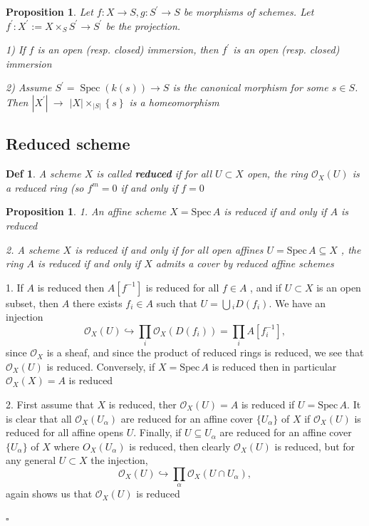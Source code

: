 \documentclass{article}
\newtheorem{definition}[theorem]{Def}
\newtheorem{proposition}[theorem]{Proposition}
\newenvironment{Proof}{{\noindent \indent \it Proof:\quad}}{\hfill $\square$\par}
\begin{document}
\begin{proposition}
    Let $f\colon X\to S,g\colon S^{\prime}\to S$ be morphisms of schemes. Let $f^{\prime}\colon X^{\prime}:=X\times_{S}S^{\prime}\to S^{\prime}$ be the projection. 
    
    1) If $f$ is an open (resp. closed) immersion, then $f^{\prime}$ is an open (resp. closed) immersion 
    
    2) Assume $S^{\prime}=\operatorname{Spec}(k(s))\to S$ is the canonical morphism for some $s\in S$.
    Then $|X^{\prime}|\ \to$  $|X|\times_{|S|}\left\{s\right\}$ is a homeomorphism
\end{proposition}






\newpage
\subsection{Reduced scheme}
\begin{definition}
    A scheme $X$ is called \textbf{reduced} if for all $U\subset X$ open, the ring ${\mathcal{O}}_{X}(U)$ is a reduced ring (so $f^{m}=0$ if and only if $\displaystyle f=0$
\end{definition}

\begin{proposition}
1. An affine scheme $X={\mathrm{Spec}}\,A$ is reduced if and only if $A$ is reduced 

2. A scheme $X$ is reduced if and only if for all open affines $U={\mathrm{Spec}}\,A\subseteq X$ , the ring $A$ is reduced if and only if $X$ admits a cover by reduced affine schemes
\end{proposition}

\begin{Proof}
    1. If $A$ is reduced then $A[f^{-1}]$ is reduced for all $f\in{A}$ , and if $U\subset{X}$ is an open subset, then $A$ 
there exists $f_{i}\in A$ such that $U=\bigcup{}_{i}D(f_{i})$. We have an injection
$$
{\mathcal{O}}_{X}(U)\hookrightarrow\prod_{i}{\mathcal{O}}_{X}(D(f_{i}))=\prod_{i}A[f_{i}^{-1}], 
$$
since ${\mathcal{O}}_{X}$ is a sheaf, and since the product of reduced rings is reduced, we see that ${\mathcal{O}}_{X}(U)$ is reduced. Conversely, if $X={\mathrm{Spec}}\,A$ is reduced then in particular ${\mathcal{O}}_{X}(X)=A$ is reduced 

2. First assume that $X$ is reduced, ther ${\mathcal{O}}_{X}(U)=A$ is reduced if $U={\mathrm{Spec}}\,A$. It is clear that all ${\mathcal{O}}_{X}(U_\alpha)$  are reduced for an affine cover $\{U_\alpha \}$ of $X$ if $\mathcal O_X(U)$ is reduced for all affine opens $U$. Finally, if $U\subseteq U_{\alpha}$ are reduced for an affine cover $\{U_{\alpha}\}$ of $X$ where $O_{X}(U_{\alpha})$ is reduced, then clearly ${\mathcal{O}}_{X}(U)$ is reduced, but for any general $U\subset X$ the injection,
$$
{\mathcal{O}}_{X}(U)\hookrightarrow\prod_{\alpha}{\mathcal{O}}_{X}(U\cap U_{\alpha}), 
$$
again shows us that ${\mathcal{O}}_{X}(U)$ is reduced

\end{Proof}
\end{document}

